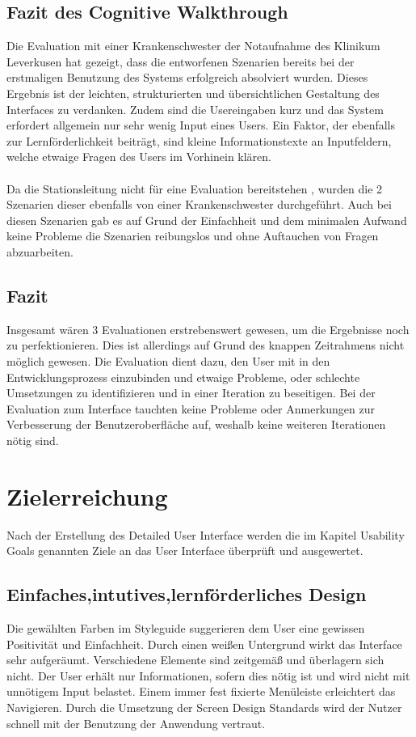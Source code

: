 \documentclass[11pt,
paper=a4,
bibtotocnumbered,	  %
liststotocnumbered,  %
DIV=calc,		  %
tablecaptionabove,	  %
headinclude,
]{article}
\begin{document}
\subsection{Fazit des Cognitive Walkthrough}
Die Evaluation mit einer Krankenschwester der Notaufnahme des Klinikum Leverkusen hat gezeigt, dass die entworfenen Szenarien bereits bei der erstmaligen Benutzung des Systems erfolgreich absolviert wurden. Dieses Ergebnis ist der leichten, strukturierten und übersichtlichen Gestaltung des Interfaces zu verdanken. Zudem sind die Usereingaben kurz und das System erfordert allgemein nur sehr wenig Input eines Users. Ein Faktor, der ebenfalls zur Lernförderlichkeit beiträgt, sind kleine Informationstexte an Inputfeldern, welche etwaige Fragen des Users im Vorhinein klären. \\\\
Da die Stationsleitung nicht für eine Evaluation bereitstehen , wurden die 2 Szenarien dieser ebenfalls von einer Krankenschwester durchgeführt. Auch bei diesen Szenarien gab es auf Grund der Einfachheit und dem minimalen Aufwand keine Probleme die Szenarien reibungslos und ohne Auftauchen von Fragen abzuarbeiten. 

\subsection{Fazit}
Insgesamt wären 3 Evaluationen erstrebenswert gewesen, um die Ergebnisse noch zu perfektionieren. Dies ist allerdings auf Grund des knappen Zeitrahmens nicht möglich gewesen. Die Evaluation dient dazu, den User mit in den Entwicklungsprozess einzubinden und etwaige Probleme, oder schlechte Umsetzungen zu identifizieren und in einer Iteration zu beseitigen.
Bei der Evaluation zum Interface tauchten keine Probleme oder Anmerkungen zur Verbesserung der Benutzeroberfläche auf, weshalb keine weiteren Iterationen nötig sind.
\section{Zielerreichung}
Nach der Erstellung des Detailed User Interface werden die im Kapitel Usability Goals genannten Ziele an das User Interface überprüft und ausgewertet.
\subsection{Einfaches,intutives,lernförderliches Design}
Die gewählten Farben im Styleguide suggerieren dem User eine gewissen Positivität und Einfachheit. Durch einen weißen Untergrund wirkt das Interface sehr aufgeräumt. Verschiedene Elemente sind zeitgemäß und überlagern sich nicht. Der User erhält nur Informationen, sofern dies nötig ist und wird nicht mit unnötigem Input belastet. Einem immer fest fixierte Menüleiste erleichtert das Navigieren. Durch die Umsetzung der Screen Design Standards wird der Nutzer schnell mit der Benutzung der Anwendung vertraut.
\end{document}

